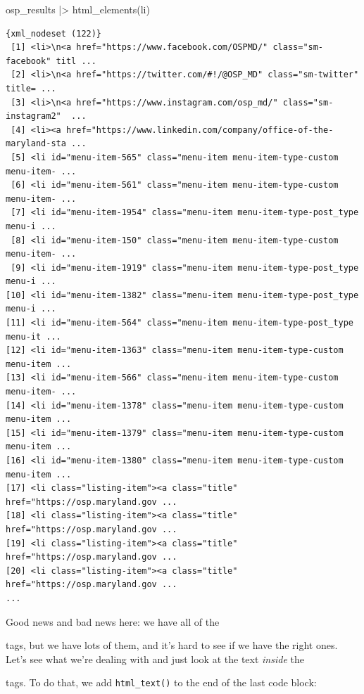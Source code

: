 \documentclass[
  letterpaper,
  DIV=11,
  numbers=noendperiod]{scrreprt}
\newenvironment{Shaded}{\begin{snugshade}}{\end{snugshade}}
\newcommand{\FunctionTok}[1]{\textcolor[rgb]{0.28,0.35,0.67}{#1}}
\newcommand{\NormalTok}[1]{\textcolor[rgb]{0.00,0.23,0.31}{#1}}
\newcommand{\SpecialCharTok}[1]{\textcolor[rgb]{0.37,0.37,0.37}{#1}}
\newcommand{\StringTok}[1]{\textcolor[rgb]{0.13,0.47,0.30}{#1}}
\begin{document}
\begin{Shaded}
\begin{Highlighting}[]
\NormalTok{osp\_results }\SpecialCharTok{|\textgreater{}} \FunctionTok{html\_elements}\NormalTok{(}\StringTok{\textquotesingle{}li\textquotesingle{}}\NormalTok{)}
\end{Highlighting}
\end{Shaded}

\begin{verbatim}
{xml_nodeset (122)}
 [1] <li>\n<a href="https://www.facebook.com/OSPMD/" class="sm-facebook" titl ...
 [2] <li>\n<a href="https://twitter.com/#!/@OSP_MD" class="sm-twitter" title= ...
 [3] <li>\n<a href="https://www.instagram.com/osp_md/" class="sm-instagram2"  ...
 [4] <li><a href="https://www.linkedin.com/company/office-of-the-maryland-sta ...
 [5] <li id="menu-item-565" class="menu-item menu-item-type-custom menu-item- ...
 [6] <li id="menu-item-561" class="menu-item menu-item-type-custom menu-item- ...
 [7] <li id="menu-item-1954" class="menu-item menu-item-type-post_type menu-i ...
 [8] <li id="menu-item-150" class="menu-item menu-item-type-custom menu-item- ...
 [9] <li id="menu-item-1919" class="menu-item menu-item-type-post_type menu-i ...
[10] <li id="menu-item-1382" class="menu-item menu-item-type-post_type menu-i ...
[11] <li id="menu-item-564" class="menu-item menu-item-type-post_type menu-it ...
[12] <li id="menu-item-1363" class="menu-item menu-item-type-custom menu-item ...
[13] <li id="menu-item-566" class="menu-item menu-item-type-custom menu-item- ...
[14] <li id="menu-item-1378" class="menu-item menu-item-type-custom menu-item ...
[15] <li id="menu-item-1379" class="menu-item menu-item-type-custom menu-item ...
[16] <li id="menu-item-1380" class="menu-item menu-item-type-custom menu-item ...
[17] <li class="listing-item"><a class="title" href="https://osp.maryland.gov ...
[18] <li class="listing-item"><a class="title" href="https://osp.maryland.gov ...
[19] <li class="listing-item"><a class="title" href="https://osp.maryland.gov ...
[20] <li class="listing-item"><a class="title" href="https://osp.maryland.gov ...
...
\end{verbatim}

Good news and bad news here: we have all of the

tags, but we have lots of them, and it's hard to see if we have the
right ones. Let's see what we're dealing with and just look at the text
\emph{inside} the

tags. To do that, we add \texttt{html\_text()} to the end of the last
code block:
\end{document}

